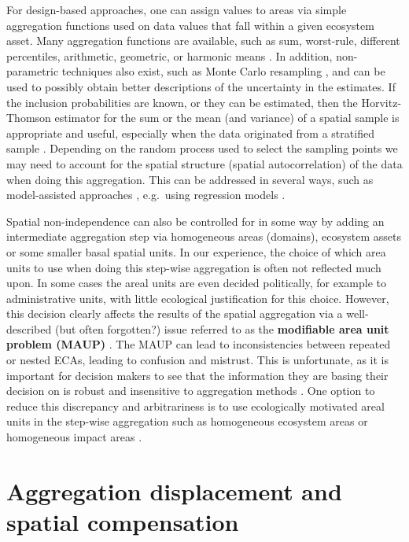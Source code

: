 \documentclass[
  authoryear,
  preprint,
  3p]{elsarticle}
\begin{document}
For design-based approaches, one can assign values to areas via simple
aggregation functions used on data values that fall within a given
ecosystem asset. Many aggregation functions are available, such as sum,
worst-rule, different percentiles, arithmetic, geometric, or harmonic
means \citep[ §5.54]{unitednations2024}. In addition, non-parametric
techniques also exist, such as Monte Carlo resampling
\citep{metode2026}, and can be used to possibly obtain better
descriptions of the uncertainty in the estimates. If the inclusion
probabilities are known, or they can be estimated, then the
Horvitz-Thomson estimator for the sum or the mean (and variance) of a
spatial sample is appropriate and useful, especially when the data
originated from a stratified sample \citep{horvitz1952}. Depending on
the random process used to select the sampling points we may need to
account for the spatial structure (spatial autocorrelation) of the data
when doing this aggregation. This can be addressed in several ways, such
as model-assisted approaches \citep{brus2021}, e.g.~using regression
models \citep{brus2000}.

Spatial non-independence can also be controlled for in some way by
adding an intermediate aggregation step via homogeneous areas (domains),
ecosystem assets or some smaller basal spatial units. In our experience,
the choice of which area units to use when doing this step-wise
aggregation is often not reflected much upon. In some cases the areal
units are even decided politically, for example to administrative units,
with little ecological justification for this choice. However, this
decision clearly affects the results of the spatial aggregation via a
well-described (but often forgotten?) issue referred to as the
\textbf{modifiable area unit problem (MAUP)}
\citep{openshaw1984, alexandridis_2010}. The MAUP can lead to
inconsistencies between repeated or nested ECAs, leading to confusion
and mistrust. This is unfortunate, as it is important for decision
makers to see that the information they are basing their decision on is
robust and insensitive to aggregation methods \citep{vanbeurden1999}.
One option to reduce this discrepancy and arbitrariness is to use
ecologically motivated areal units in the step-wise aggregation such as
homogeneous ecosystem areas \citep{vallecillo2022} or homogeneous impact
areas \citep{kolstad_making_2024}.

\section{Aggregation displacement and spatial
compensation}\label{sec-agg}
\end{document}
